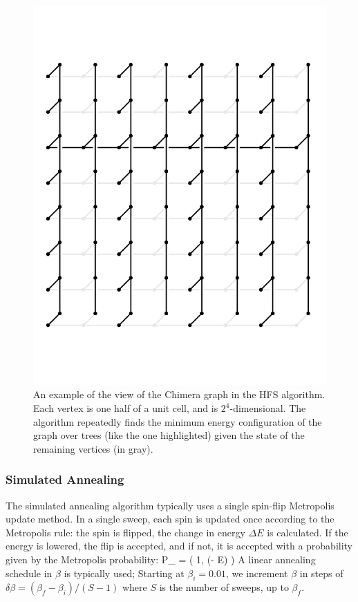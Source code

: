 \begin{figure}
\begin{center}
\includegraphics[width=\columnwidth]{chapters/Planted/selbytree}
\caption{An example of the view of the Chimera graph in the HFS algorithm. Each vertex is one half of a unit cell, and is $2^4$-dimensional. The algorithm repeatedly finds the minimum energy configuration of the graph over trees (like the one highlighted) given the state of the remaining vertices (in gray).}
\label{fig:SelbyTree}
\end{center}
\end{figure}


\subsubsection{Simulated Annealing}
The simulated annealing algorithm \cite{kirkpatrick_optimization_1983,Isakov:2015ao} typically uses a single spin-flip Metropolis update method.  In a single sweep, each spin is updated once according to the Metropolis rule: the spin is flipped, the change in energy $\Delta E$ is calculated.  If the energy is lowered, the flip is accepted, and if not, it is accepted with a probability given by the Metropolis probability:
%
\beq
P_{} = \min \left( 1, \exp (- \beta \Delta E) \right)
\eeq
%
A linear annealing schedule in $\beta$ is typically used; Starting at $\beta_i = 0.01$, we increment $\beta$ in steps of  $\delta\beta = (\beta_f-\beta_i)/(S-1)$ where $S$ is the number of sweeps, up to $\beta_f$.

